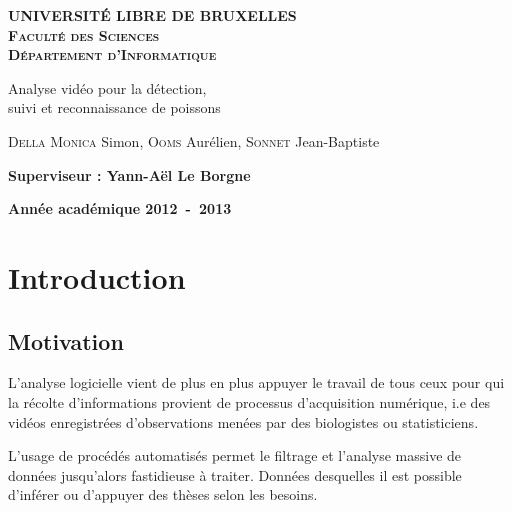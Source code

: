 \documentclass[a4paper,12pt]{report}
\begin{document}
\setlength\parindent{0pt} %


\begin{titlepage}
\begin{center}
\textbf{\textsc{UNIVERSIT\'E LIBRE DE BRUXELLES}}\\
\textbf{\textsc{Faculté des Sciences}}\\
\textbf{\textsc{Département d'Informatique}}
\vfill{}\vfill{}
\begin{center}{\Huge Analyse vidéo pour la détection, \\ suivi et reconnaissance de poissons}\end{center}{\Huge \par}
\begin{center}{\large \textsc{Della Monica} Simon, \textsc{Ooms} Aurélien, \textsc{Sonnet} Jean-Baptiste}\end{center}{\Huge \par}
\vfill{}\vfill{}
\begin{flushleft}{\large \textbf{Superviseur : Yann-A\"{e}l Le Borgne}}\hfill{}\end{flushleft}{\large\par}
\vfill{}\vfill{}\enlargethispage{3cm}
\textbf{Année académique 2012~-~2013}
\end{center}
\end{titlepage}




\tableofcontents
\newpage

\chapter{Introduction}


\section{Motivation}

L'analyse logicielle vient de plus en plus appuyer le travail de tous ceux pour qui la récolte d'informations provient de processus d'acquisition numérique, i.e des vidéos enregistrées d'observations menées par des biologistes ou statisticiens.
 
L'usage de procédés automatisés permet le filtrage et l'analyse massive de données jusqu'alors fastidieuse à traiter. Données desquelles il est possible d'inférer ou d'appuyer des thèses selon les besoins.
\end{document}
